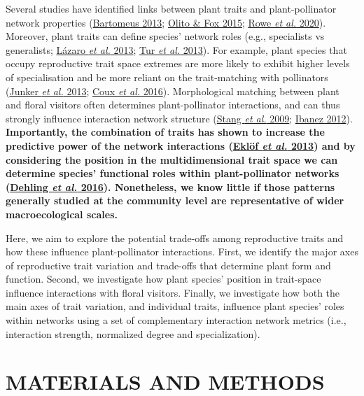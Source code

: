 \documentclass[
  12pt,
  a4paper,
]{article}
\begin{document}
Several studies have identified links between plant traits and plant-pollinator network properties (\protect\hyperlink{ref-bartomeus2013}{Bartomeus 2013}; \protect\hyperlink{ref-olito2015}{Olito \& Fox 2015}; \protect\hyperlink{ref-rowe2020}{Rowe \emph{et al.} 2020}). Moreover, plant traits can define species' network roles (e.g., specialists vs generalists; \protect\hyperlink{ref-lazaro2013}{Lázaro \emph{et al.} 2013}; \protect\hyperlink{ref-tur2013}{Tur \emph{et al.} 2013}). For example, plant species that occupy reproductive trait space extremes are more likely to exhibit higher levels of specialisation and be more reliant on the trait-matching with pollinators (\protect\hyperlink{ref-junker2013}{Junker \emph{et al.} 2013}; \protect\hyperlink{ref-coux2016}{Coux \emph{et al.} 2016}). Morphological matching between plant and floral visitors often determines plant-pollinator interactions, and can thus strongly influence interaction network structure (\protect\hyperlink{ref-stang2009}{Stang \emph{et al.} 2009}; \protect\hyperlink{ref-ibanez2012}{Ibanez 2012}). \textbf{Importantly, the combination of traits has shown to increase the predictive power of the network interactions (\protect\hyperlink{ref-eklof2013}{Eklöf \emph{et al.} 2013}) and by considering the position in the multidimensional trait space we can determine species' functional roles within plant-pollinator networks (\protect\hyperlink{ref-dehling2016}{Dehling \emph{et al.} 2016}). Nonetheless, we know little if those patterns generally studied at the community level are representative of wider macroecological scales.}

Here, we aim to explore the potential trade-offs among reproductive traits and how these influence plant-pollinator interactions. First, we identify the major axes of reproductive trait variation and trade-offs that determine plant form and function. Second, we investigate how plant species' position in trait-space influence interactions with floral visitors. Finally, we investigate how both the main axes of trait variation, and individual traits, influence plant species' roles within networks using a set of complementary interaction network metrics (i.e., interaction strength, normalized degree and specialization).

\hypertarget{materials-and-methods}{%
\section{MATERIALS AND METHODS}\label{materials-and-methods}}
\end{document}
